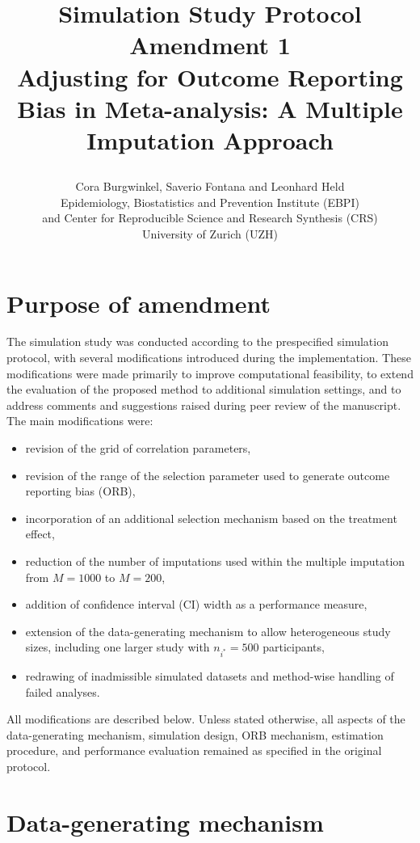 \documentclass[11pt]{article}
\title{\textbf{Simulation Study Protocol Amendment 1} \\
Adjusting for Outcome Reporting Bias in Meta-analysis: A Multiple Imputation Approach \\
\author{Cora Burgwinkel, Saverio Fontana and Leonhard Held\\ 
Epidemiology, Biostatistics
and Prevention Institute (EBPI)\\ 
and Center for Reproducible Science and Research Synthesis (CRS) \\
University of Zurich (UZH)}}
\date{}
\begin{document}
\maketitle


\tableofcontents
\thispagestyle{empty}
\newpage

\setcounter{page}{1}

\section{Purpose of amendment}
The simulation study was conducted according to the prespecified simulation protocol, with several modifications introduced during the implementation. These modifications were made primarily to improve computational feasibility, to extend the evaluation of the proposed method to additional simulation settings, and to address comments and suggestions raised during peer review of the manuscript.
\noindent
The main modifications were:

\begin{itemize}
    \item revision of the grid of correlation parameters,
    \item revision of the range of the selection parameter used to generate outcome reporting bias (ORB),
    \item incorporation of an additional selection mechanism based on the treatment effect,
    \item reduction of the number of imputations used within the multiple imputation from $M=1000$ to $M=200$,
    \item addition of confidence interval (CI) width as a performance measure,
    \item extension of the data-generating mechanism to allow heterogeneous study sizes, including one larger study with $n_{i^\ast} = 500$ participants,
    \item redrawing of inadmissible simulated datasets and method-wise handling of failed analyses.
\end{itemize}

All modifications are described below. Unless stated otherwise, all aspects of the data-generating mechanism, simulation design, ORB mechanism, estimation procedure, and performance evaluation remained as specified in the original protocol. 

\section{Data-generating mechanism}
\end{document}
